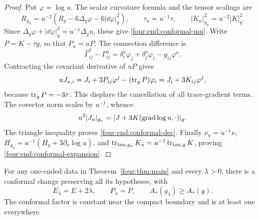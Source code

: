 \begin{proof}
Put \(\varphi=\log u\). The scalar curvature formula and the tensor
scalings are
\[
 R_{g_u}=u^{-2}(R_g-6\Delta_g\varphi-6|\dd\varphi|_g^2),
 \qquad \tau_u=u^{-1}\tau,\qquad
 |K_u|_{g_u}^2=u^{-2}|K|_g^2.
\]
Since \(\Delta_g\varphi+|\dd\varphi|_g^2=u^{-1}\Delta_g u\), these
give \eqref{four:end:conformal-mu}. Write \(P=K-\tau g\), so that
\(P_u=uP\). The connection difference is
\[
 \widehat\Gamma^a_{ij}-\Gamma^a_{ij}
 =\delta_i^a\varphi_j+\delta_j^a\varphi_i-g_{ij}\varphi^a.
\]
Contracting the covariant derivative of \(uP\) gives
\[
 uJ_{u,i}=J_i+3P_{ij}\varphi^j-(\operatorname{tr}_gP)\varphi_i
          =J_i+3K_{ij}\varphi^j,
\]
because \(\operatorname{tr}_gP=-3\tau\). This displays the cancellation of all
trace-gradient terms. The covector norm scales by \(u^{-1}\), whence
\[
 u^2|J_u|_{g_u}=|J+3K(\operatorname{grad}\log u,\cdot)|_g.
\]
The triangle inequality proves \eqref{four:end:conformal-dec}.
Finally \(\nu_u=u^{-1}\nu\),
\(H_{g_u}=u^{-1}(H_g+3\partial_\nu\log u)\), and
\(\operatorname{tr}_{\mathrm{tan},g_u}K_u=u^{-1}\operatorname{tr}_{\mathrm{tan},g}K\), proving
\eqref{four:end:conformal-expansion}.
\end{proof}

\begin{lemma}\label{four:end:positive-shell}
For any one-ended data in Theorem~\ref{four:thm:main} and every \(\lambda>0\),
there is a conformal change preserving all its hypotheses, with
\[
 E_\lambda=E+2\lambda,\qquad P_\lambda=P,
 \qquad A_*(g_\lambda)\ge A_*(g).
\]
The conformal factor is constant near the compact boundary and is at
least one everywhere.
\end{lemma}

